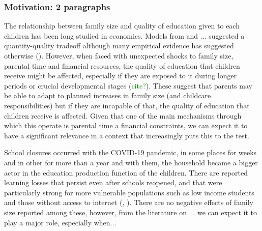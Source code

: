 





\subsubsection{Motivation: 2 paragraphs}

The relationship between family size and quality of education given to each children has been long studied in economics. Models from \cite{becker_child_1976} and ... suggested a quantity-quality tradeoff although many empirical evidence has suggested otherwise (\cite{black_more_2005}). However, when faced with unexpected shocks to family size, parental time and financial resources, the quality of education that children receive might be affected, especially if they are exposed to it during longer periods or crucial developmental stages (\textcolor{green}{cite?}). These suggest that parents may be able to adapt to planned increases in family size (and childcare responsibilities) but if they are incapable of that, the quality of education that children receive is affected. Given that one of the main mechanisms through which this operate is parental time a financial constraints, we can expect it to have a significant relevance in a context that increasingly puts this to the test.

School closures occurred with the COVID-19 pandemic, in some places for weeks and in other for more than a year and with them, the household became a bigger actor in the education production function of the children. There are reported learning losses that persist even after schools reopened, and that were particularly strong for more vulnerable populations such as low income students and those without access to internet (\cite{haelermans_inequality_2022}, \cite{jakubowski_global_2023}). There are no negative effects of family size reported among these, however, from the literature on ... we can expect it to play a major role, especially when...




